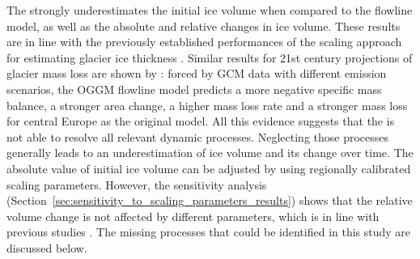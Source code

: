     The \vas{} strongly underestimates the initial ice volume when compared to the flowline model, as well as the absolute and relative changes in ice volume. These results are in line with the previously established performances of the scaling approach for estimating glacier ice thickness \citep{Andreassen2015, Farinotti2017}. Similar results for 21st century projections of glacier mass loss are shown by \citet[Figures S1--S20 in the supporting informations]{Marzeion2020}: forced by GCM data with different emission scenarios, the OGGM flowline model predicts a more negative specific mass balance, a stronger area change, a higher mass loss rate and a stronger mass loss for  central Europe as the  original \citet{Marzeion2012b} \vas{} model. All this evidence suggests that the \vas{} is not able to resolve all relevant dynamic processes. Neglecting those processes generally leads to an underestimation of ice volume and its change over time. The absolute value of initial ice volume can be adjusted by using regionally calibrated scaling parameters. However, the sensitivity analysis (Section~\ref{sec:sensitivity_to_scaling_parameters_results}) shows that the relative volume change is not affected by different parameters, which is in line with previous studies \citep{Radic2007, Radic2008}. The missing processes that could be identified in this study are discussed below.

